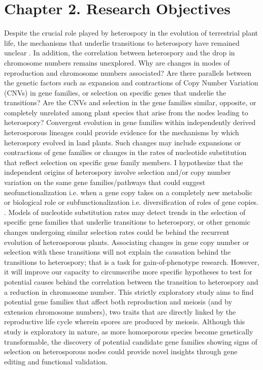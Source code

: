 \chapter{Chapter 2. Research Objectives}

Despite the crucial role played by heterospory in the evolution of terrestrial plant life, the mechanisms that underlie transitions to heterospory have remained unclear \cite{Kinosian2022-uf}. In addition, the correlation between heterospory and the drop in chromosome numbers remains unexplored. Why are changes in modes of reproduction and chromosome numbers associated? Are there parallels between the genetic factors such as expansion and contractions of Copy Number Variation (CNVs) in gene families, or selection on specific genes that underlie the transitions? Are the CNVs and selection in the gene families similar, opposite, or completely unrelated among plant species that arise from the nodes leading to heterospory?
Convergent evolution in gene families within independently derived heterosporous lineages could provide evidence for the mechanisms by which heterospory evolved in land plants. Such changes may include expansions or contractions of gene families or changes in the rates of nucleotide substitution that reflect selection on specific gene family members. I hypothesize that the independent origins of heterospory involve selection and/or copy number variation on the same gene families/pathways that could suggest neofunctionalization i.e. when a gene copy takes on a completely new metabolic or biological role or subfunctionalization i.e. diversification of roles of gene copies. . Models of nucleotide substitution rates may detect trends in the selection of specific gene families that underlie transitions to heterospory, or other genomic changes undergoing similar selection rates could be behind the recurrent evolution of heterosporous plants.
Associating changes in gene copy number or selection with these transitions will not explain the causation behind the transitions to heterospory; that is a task for gain-of-phenotype research. However, it will improve our capacity to circumscribe more specific hypotheses to test for potential causes behind the correlation between the transition to heterospory and a reduction in chromosome number. This strictly exploratory study aims to find potential gene families that affect both reproduction and meiosis (and by extension chromosome numbers), two traits that are directly linked by the reproductive life cycle wherein spores are produced by meiosis. Although this study is exploratory in nature, as more homosporous species become genetically transformable, the discovery of potential candidate gene families showing signs of selection on heterosporous nodes could provide novel insights through gene editing and functional validation. 